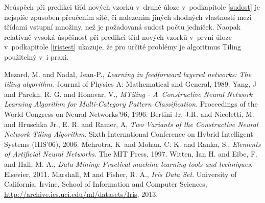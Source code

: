 \documentclass[a4paper, 11pt]{article}
\begin{document}
Neúspěch při predikci tříd nových vzorků v~druhé úloze v~podkapitole \ref{sudost} je nejspíše způsoben přeučením sítě, či nalezením jiných shodných vlastností mezi třídami vstupní množiny, než je požadovaná sudost počtu jedniček. Naopak relativně vysoká úspěšnost při predikci tříd nových vzorků v~první úloze v~podkapitole \ref{iristest} ukazuje, že pro určité problémy je algoritmus Tiling použitelný v~i praxi.

\begin{thebibliography}{9}
  Mezard, M. and Nadal, Jean-P.,
  \emph{Learning in feedforward layered networks: The tiling algorithm}.
  Journal of Physics A: Mathematical and General,
  1989.
  Yang, J and  Parekh, R. G. and Honavar, V.,
  \emph{MTiling - A~Constructive Neural Network Learning Algorithm for Multi-Category Pattern Classification}.
  Proceedings of the World Congress on Neural Networks'96,
  1996.
  Bertini Jr, J.R. and Nicoletti, M. and Hruschka Jr., E. R. and Ramer, A,
  \emph{Two Variants of the Constructive Neural Network Tiling Algorithm}.
  Sixth International Conference on Hybrid Intelligent Systems (HIS'06),
  2006.
  Mehrotra, K~and Mohan, C. K. and Ranka, S.,
  \emph{Elements of Artificial Neural Networks}.
  The MIT Press,
  1997.
  Witten, Ian H. and Eibe, F. and Hall, M. A.,
  \emph{Data Mining: Practical machine learning tools and techniques}.
  Elsevier,
  2011.
  Marshall, M and Fisher, R. A.,
  \emph{Iris Data Set}.
  University of California, Irvine, School of Information and Computer Sciences,
  \url{http://archive.ics.uci.edu/ml/datasets/Iris},
  2013.
\end{thebibliography}
\end{document}
